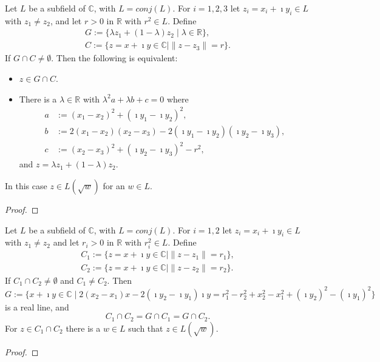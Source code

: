 \begin{lemma}
    \label{Lem:Intersection_line_circle}
    Let $L$ be a subfield of $\mathbb{C}$, with $L = conj(L)$. For $i = 1,2,3$ let $z_i = x_i + \imath y_i \in L$ with $z_1 \ne z_2$, and let $r > 0$ in $\mathbb{R}$ with $r^2 \in L$. Define
    \begin{equation*}\begin{aligned}
        G := \{\lambda z_1 + (1-\lambda)z_2 \mid \lambda \in \mathbb{R}\},\\
        C := \{z = x + \imath y \in \mathbb{C} \mid \|z - z_3\| = r\}.
    \end{aligned} \end{equation*}
    If $G \cap C \ne \emptyset$. Then the following is equivalent:
    \begin{itemize}
        \item $z\in G \cap C$.
        \item There is a $\lambda \in \mathbb{R}$ with $\lambda^2 a+ \lambda b + c = 0$ where
        \begin{align*}
            a &:= (x_1 - x_2)^2 + (\imath y_1 - \imath y_2)^2,\\
            b &:= 2(x_1 - x_2)(x_2 - x_3) - 2(\imath y_1 - \imath y_2)(\imath y_2 - \imath y_3),\\
            c &:= (x_2 - x_3)^2 + (\imath y_2 - \imath y_3)^2 - r^2,
        \end{align*}
        and $z = \lambda z_1 + (1-\lambda)z_2$.
    \end{itemize}
    In this case $z \in L(\sqrt{w})$ for an $w \in L$.
\end{lemma}

\begin{proof}
\end{proof}

\begin{lemma}
    \label{Lem:Intersection_circle_circle}
    Let $L$ be a subfield of $\mathbb{C}$, with $L = conj(L)$. For $i = 1,2 $ let $z_i = x_i + \imath y_i \in L$ with $z_1 \ne z_2$ and let $r_i > 0$ in $\mathbb{R}$ with $r_i^2 \in L$. Define
    \begin{equation*} \begin{aligned}
        C_1 := \{z = x + \imath y \in \mathbb{C} \mid \|z - z_1\| = r_1\},\\
        C_2 := \{z = x + \imath y \in \mathbb{C} \mid \|z - z_2\| = r_2\}.
    \end{aligned} \end{equation*}
    If $C_1 \cap C_2 \ne \emptyset$ and $C_1 \ne C_2$. Then 
    $$G := \{x+\imath y \in \mathbb{C} \mid 2(x_2 - x_1)x - 2(\imath y_2 - \imath y_1)\imath y = r_1^2 - r_2^2 + x_2^2 - x_1^2 + (\imath y_2)^2 - (\imath y_1)^2\} $$
    is a real line, and $$ C_1 \cap C_2 = G \cap C_1 = G \cap C_2. $$
    For $z \in C_1 \cap C_2$ there is a $w \in L$ such that $z \in L(\sqrt{w})$.
\end{lemma}
\begin{proof}
\end{proof}


